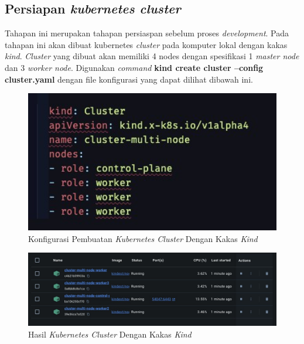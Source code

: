 \subsection{Persiapan \textit{kubernetes cluster}}

Tahapan ini merupakan tahapan persiaspan sebelum proses \textit{development}. Pada tahapan ini akan dibuat kubernetes \textit{cluster} pada komputer lokal dengan kakas \textit{kind}. \textit{Cluster} yang dibuat akan memiliki 4 nodes dengan spesifikasi 1 \textit{master node} dan 3 \textit{worker node}. Digunakan \textit{command} \textbf{kind create cluster --config cluster.yaml} dengan file konfigurasi yang dapat dilihat dibawah ini.

\begin{figure}[ht]
  \centering
  \includegraphics[width=1\textwidth]{resources/appendix/pembuatan-cluster.jpg}
  \caption{Konfigurasi Pembuatan \textit{Kubernetes Cluster} Dengan Kakas \textit{Kind}}
  \label{fig:konfigurasi-pembuatan-cluster}
\end{figure}

\begin{figure}[ht]
  \centering
  \includegraphics[width=1\textwidth]{resources/chapter-4/cluster-kind.jpg}
  \caption{Hasil \textit{Kubernetes Cluster} Dengan Kakas \textit{Kind}}
  \label{fig:hasil-cluster-kind}
\end{figure}

\pagebreak